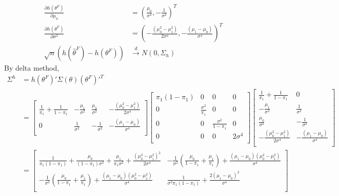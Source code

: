 \documentclass[11pt]{article} %
\begin{document}
\begin{itemize}
\begin{align*}
		\frac{\partial h(\theta^F )}{\partial \mu_0} & = (\frac{\mu_0}{\sigma^2}, -\frac{1}{\sigma^2})^T\\
		\frac{\partial h(\theta^F )}{\partial \sigma^2} & = \left(-\frac{(\mu_0^2 - \mu_1^2)}{2\sigma^4}, -\frac{(\mu_1-\mu_0)}{\sigma^4} \right)^T\\
		\sqrt{n} (h(\hat\theta^F ) - h(\theta^F )) & \xrightarrow[]{d} N \left(0, \Sigma_ h \right)
	\end{align*}   
	By delta method, 
	\begin{align*}    
		\Sigma^{h} &= h(\theta^F )'\Sigma(\theta) (\theta^F )'^T\\
		&=\begin{bmatrix}
			\frac{1}{\pi_1}+\frac{1}{1-\pi_1} & -\frac{\mu_1}{\sigma^2} & \frac{\mu_0}{\sigma^2} &-\frac{(\mu_0^2 - \mu_1^2)}{2\sigma^4}\\
			0 & \frac{1}{\sigma^2} & -\frac{1}{\sigma^2} & -\frac{(\mu_1-\mu_0)}{\sigma^4}\\
		\end{bmatrix}\begin{bmatrix}
			\pi_1(1-\pi_1) & 0 & 0 & 0\\
			0 & \frac{\sigma^2}{ \pi_1} & 0 & 0\\
			0 & 0 & \frac{\sigma^2}{ 1-\pi_1} & 0\\
			0 & 0 & 0 & 2\sigma^4 \\
		\end{bmatrix}\begin{bmatrix}
			\frac{1}{\pi_1}+\frac{1}{1-\pi_1} & 0 \\
			-\frac{\mu_1}{\sigma^2} & \frac{1}{\sigma^2}\\
			\frac{\mu_0}{\sigma^2} & -\frac{1}{\sigma^2}\\
			-\frac{(\mu_0^2 - \mu_1^2)}{2\sigma^4} & -\frac{(\mu_1-\mu_0)}{\sigma^4} \\
		\end{bmatrix}\\
		&= \begin{bmatrix}
			\frac{1}{\pi_1(1-\pi_1)} + \frac{\mu_0}{(1-\pi_1)\sigma^2} + \frac{\mu_1}{\pi_1\sigma^2} + \frac{(\mu_0^2 - \mu_1^2)^2}{2\sigma^4} & -\frac{1}{\sigma^2}(\frac{\mu_0}{1-\pi_1} + \frac{\mu_1}{\pi_1}) + \frac{(\mu_1-\mu_0)(\mu_0^2- \mu_1^2)}{\sigma^4} \\
			-\frac{1}{\sigma^2}(\frac{\mu_0}{1-\pi_1} + \frac{\mu_1}{\pi_1}) + \frac{(\mu_1-\mu_0)(\mu_0^2- \mu_1^2)}{\sigma^4}  & \frac{1}{\sigma^2 \pi_1(1-\pi_1)} + \frac{2(\mu_1-\mu_0)^2}{\sigma^4}\\

\end{bmatrix}
\end{align*}
\end{itemize}
\end{document}

